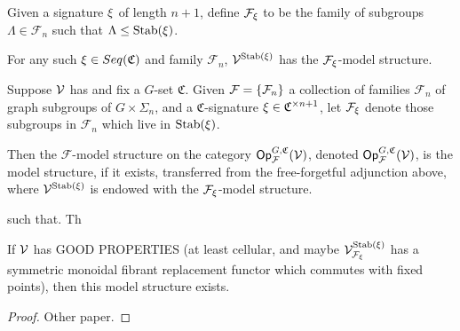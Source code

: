 \documentclass[psamsfonts,onesided,10pt,letterpaper]{amsart}%
\renewcommand{\C}{\ensuremath{\mathfrak{C}}}
\renewcommand{\F}{\mathcal F}
\renewcommand{\H}{\ensuremath{\mathbb{H}}}
\renewcommand{\1}{\ensuremath{\mathbb{id}}}
\begin{document}
Given a signature $\xi$ of length $n+1$, define $\F_\ksi$ to be the family of subgroups $\Lambda\in \F_n$ such that $\Lambda\leq \mathrm{Stab}(\xi)$.
\begin{corollary}
  For any such $\ksi\in Seq(\C)$ and family $\F_n$, $\mathcal V^{\mathrm{Stab}(\xi)}$ has the $\F_\ksi$-model structure.
\end{corollary}

\begin{definition}
      Suppose $\mathcal V$ has
      and fix a $G$-set $\mathfrak C$.
      Given $\F = \set{\F_n}$ a collection of families $\F_n$ of graph subgroups of $G \times \Sigma_n$,
      and a $\mathfrak C$-signature $\xi \in \mathfrak C^{\times n+1}$,
      let $\F_\ksi$ denote those subgroups in $\F_n$ which live in $\mathrm{Stab}(\xi)$.

      Then the $\F$-model structure on the category $\Op^{G,\mathfrak C}_\F(\V)$, denoted $\Op^{G,\mathfrak C}_\F(\V)$,
      is the model structure, if it exists, transferred from the free-forgetful adjunction above,
      where $\mathcal V^{\mathrm{Stab}(\xi)}$ is endowed with the $\F_\ksi$-model structure.
      
      such that. Th
\end{definition}
\begin{proposition}
      If $\mathcal V$ has {\color{red} GOOD PROPERTIES}
      (at least cellular, and maybe
      $\V^{\Stab(\ksi)}_{\F_\ksi}$ has a symmetric monoidal fibrant replacement functor which commutes with fixed points),
      then this model structure exists.
\end{proposition}
\begin{proof}
      Other paper.
\end{proof}
\end{document}
